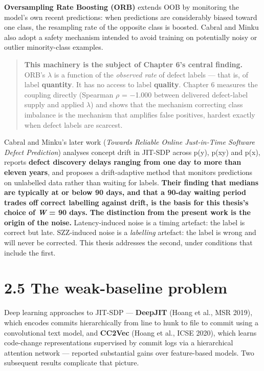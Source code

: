 \textbf{Oversampling Rate Boosting (ORB)} extends OOB by monitoring the
model's own recent predictions: when predictions are considerably biased
toward one class, the resampling rate of the opposite class is boosted.
Cabral and Minku also adopt a safety mechanism intended to avoid
training on potentially noisy or outlier minority-class examples.

\begin{quote}
\textbf{This machinery is the subject of Chapter 6's central finding.}
ORB's \ensuremath{\lambda} is a function of the \emph{observed rate} of defect labels ---
that is, of label \textbf{quantity}. It has no access to label
\textbf{quality}. Chapter 6 measures the coupling directly (Spearman \ensuremath{\rho} =
\ensuremath{-}1.000 between delivered defect-label supply and applied \ensuremath{\lambda}) and shows
that the mechanism correcting class imbalance is the mechanism that
amplifies false positives, hardest exactly when defect labels are
scarcest.
\end{quote}

Cabral and Minku's later work (\emph{Towards Reliable Online
Just-in-Time Software Defect Prediction}) analyses concept drift in
JIT-SDP across p(y), p(x\textbar y) and p(x), reports \textbf{defect
discovery delays ranging from one day to more than eleven years}, and
proposes a drift-adaptive method that monitors predictions on unlabelled
data rather than waiting for labels. \textbf{Their finding that medians
are typically at or below 90 days, and that a 90-day waiting period
trades off correct labelling against drift, is the basis for this
thesis's choice of \emph{W} = 90 days.} \textbf{The distinction from the
present work is the origin of the noise.} Latency-induced noise is a
timing artefact: the label is correct but late. SZZ-induced noise is a
\emph{labelling} artefact: the label is wrong and will never be
corrected. This thesis addresses the second, under conditions that
include the first.

\section{2.5 The weak-baseline problem}\label{the-weak-baseline-problem}

Deep learning approaches to JIT-SDP --- \textbf{DeepJIT} (Hoang et al.,
MSR 2019), which encodes commits hierarchically from line to hunk to
file to commit using a convolutional text model, and \textbf{CC2Vec}
(Hoang et al., ICSE 2020), which learns code-change representations
supervised by commit logs via a hierarchical attention network ---
reported substantial gains over feature-based models. Two subsequent
results complicate that picture.

